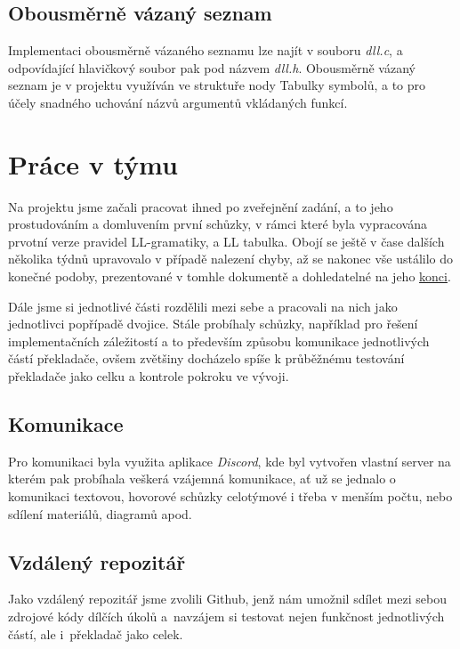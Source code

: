 \documentclass[a4paper, 11pt]{article}
\begin{document}
	\subsection{Obousměrně vázaný seznam}
	Implementaci obousměrně vázaného seznamu lze najít v souboru \textit{dll.c}, a odpovídající hlavičkový soubor pak pod názvem \textit{dll.h}. Obousměrně 
	vázaný seznam je v projektu využíván ve struktuře nody Tabulky symbolů, a to pro účely snadného uchování názvů argumentů vkládaných funkcí.
	\section{Práce v týmu}
	Na projektu jsme začali pracovat ihned po zveřejnění zadání, a to jeho prostudováním a domluvením první schůzky, v rámci které byla vypracována prvotní 
	verze pravidel LL-gramatiky, a LL tabulka. Obojí se ještě v čase dalších několika týdnů upravovalo v případě nalezení chyby, až se nakonec vše ustálilo do 
	konečné podoby, prezentované v tomhle dokumentě a dohledatelné na jeho \hyperref[gram]{konci}.
	
	Dále jsme si jednotlivé části rozdělili mezi sebe a pracovali na nich jako jednotlivci popřípadě dvojice. Stále probíhaly schůzky, například pro řešení 
	implementačních záležitostí a to především způsobu komunikace jednotlivých částí překladače, ovšem zvětšiny docházelo spíše k průběžnému testování 
	překladače jako celku a kontrole pokroku ve vývoji.
	\subsection{Komunikace}
	Pro komunikaci byla využita aplikace \textit{Discord}, kde byl vytvořen vlastní server na kterém pak probíhala veškerá vzájemná komunikace, ať už se 
	jednalo o komunikaci textovou, hovorové schůzky celotýmové i třeba v menším počtu, nebo sdílení materiálů, diagramů apod. 
	\subsection{Vzdálený repozitář}
	Jako vzdálený repozitář jsme zvolili Github, jenž nám umožnil sdílet mezi sebou zdrojové kódy dílčích úkolů a~navzájem si testovat nejen funkčnost 
	jednotlivých částí, ale i~překladač jako celek.
\end{document}
